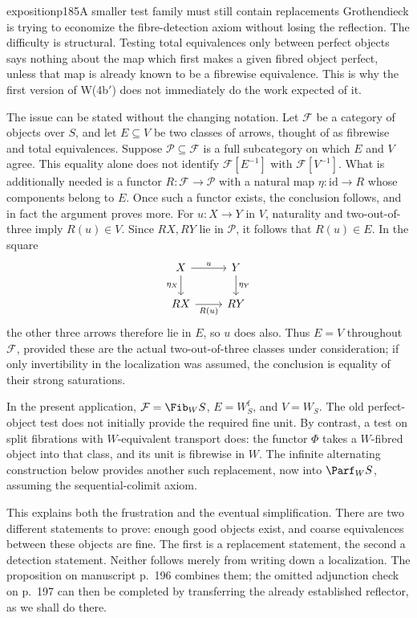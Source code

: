 \begin{dcomment}{exposition}{p185}{A smaller test family must still contain replacements}
Grothendieck is trying to economize the fibre-detection axiom without losing the reflection. The difficulty is structural. Testing total equivalences only between perfect objects says nothing about the map which first makes a given fibred object perfect, unless that map is already known to be a fibrewise equivalence. This is why the first version of W(4b$'$) does not immediately do the work expected of it.

The issue can be stated without the changing notation. Let $\mathcal F$ be a category of objects over $S$, and let $E\subseteq V$ be two classes of arrows, thought of as fibrewise and total equivalences. Suppose $\mathcal P\subseteq\mathcal F$ is a full subcategory on which $E$ and $V$ agree. This equality alone does not identify $\mathcal F[E^{-1}]$ with $\mathcal F[V^{-1}]$. What is additionally needed is a functor $R:\mathcal F\to\mathcal P$ with a natural map $\eta:\mathrm{id}\to R$ whose components belong to $E$. Once such a functor exists, the conclusion follows, and in fact the argument proves more. For $u:X\to Y$ in $V$, naturality and two-out-of-three imply $R(u)\in V$. Since $RX,RY$ lie in $\mathcal P$, it follows that $R(u)\in E$. In the square
\[
\begin{tikzcd}
 X\arrow[r,"u"]\arrow[d,"\eta_X"'] &Y\arrow[d,"\eta_Y"]\\
 RX\arrow[r,"R(u)"']&RY
\end{tikzcd}
\]
the other three arrows therefore lie in $E$, so $u$ does also. Thus $E=V$ throughout $\mathcal F$, provided these are the actual two-out-of-three classes under consideration; if only invertibility in the localization was assumed, the conclusion is equality of their strong saturations.

In the present application, $\mathcal F=\Fib_W S$, $E=W_S^{\mathrm f}$, and $V=W_S$. The old perfect-object test does not initially provide the required fine unit. By contrast, a test on split fibrations with $W$-equivalent transport does: the functor $\Phi$ takes a $W$-fibred object into that class, and its unit is fibrewise in $W$. The infinite alternating construction below provides another such replacement, now into $\Parf_W S$, assuming the sequential-colimit axiom.

This explains both the frustration and the eventual simplification. There are two different statements to prove: enough good objects exist, and coarse equivalences between these objects are fine. The first is a replacement statement, the second a detection statement. Neither follows merely from writing down a localization. The proposition on manuscript p.~196 combines them; the omitted adjunction check on p.~197 can then be completed by transferring the already established reflector, as we shall do there.
\end{dcomment}

